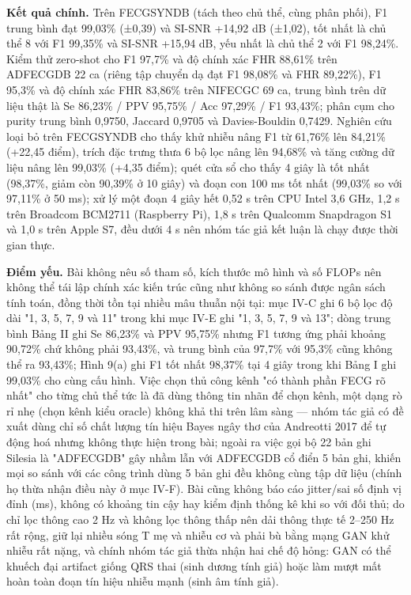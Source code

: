 \documentclass[12pt,a4paper]{article}
\begin{document}
\noindent \textbf{Kết quả chính.} Trên FECGSYNDB (tách theo chủ thể, cùng phân phối), F1 trung bình đạt 99,03\% (±0,39) và SI-SNR +14,92 dB (±1,02), tốt nhất là chủ thể 8 với F1 99,35\% và SI-SNR +15,94 dB, yếu nhất là chủ thể 2 với F1 98,24\%. Kiểm thử zero-shot cho F1 97,7\% và độ chính xác FHR 88,61\% trên ADFECGDB 22 ca (riêng tập chuyển dạ đạt F1 98,08\% và FHR 89,22\%), F1 95,3\% và độ chính xác FHR 83,86\% trên NIFECGC 69 ca, trung bình trên dữ liệu thật là Se 86,23\% / PPV 95,75\% / Acc 97,29\% / F1 93,43\%; phân cụm cho purity trung bình 0,9750, Jaccard 0,9705 và Davies-Bouldin 0,7429. Nghiên cứu loại bỏ trên FECGSYNDB cho thấy khử nhiễu nâng F1 từ 61,76\% lên 84,21\% (+22,45 điểm), trích đặc trưng thưa 6 bộ lọc nâng lên 94,68\% và tăng cường dữ liệu nâng lên 99,03\% (+4,35 điểm); quét cửa sổ cho thấy 4 giây là tốt nhất (98,37\%, giảm còn 90,39\% ở 10 giây) và đoạn con 100 ms tốt nhất (99,03\% so với 97,11\% ở 50 ms); xử lý một đoạn 4 giây hết 0,52 s trên CPU Intel 3,6 GHz, 1,2 s trên Broadcom BCM2711 (Raspberry Pi), 1,8 s trên Qualcomm Snapdragon S1 và 1,0 s trên Apple S7, đều dưới 4 s nên nhóm tác giả kết luận là chạy được thời gian thực.\par\vspace{3pt}
\noindent \textbf{Điểm yếu.} Bài không nêu số tham số, kích thước mô hình và số FLOPs nên không thể tái lập chính xác kiến trúc cũng như không so sánh được ngân sách tính toán, đồng thời tồn tại nhiều mâu thuẫn nội tại: mục IV-C ghi 6 bộ lọc độ dài "1, 3, 5, 7, 9 và 11" trong khi mục IV-E ghi "1, 3, 5, 7, 9 và 13"; dòng trung bình Bảng II ghi Se 86,23\% và PPV 95,75\% nhưng F1 tương ứng phải khoảng 90,72\% chứ không phải 93,43\%, và trung bình của 97,7\% với 95,3\% cũng không thể ra 93,43\%; Hình 9(a) ghi F1 tốt nhất 98,37\% tại 4 giây trong khi Bảng I ghi 99,03\% cho cùng cấu hình. Việc chọn thủ công kênh "có thành phần FECG rõ nhất" cho từng chủ thể tức là đã dùng thông tin nhãn để chọn kênh, một dạng rò rỉ nhẹ (chọn kênh kiểu oracle) không khả thi trên lâm sàng — nhóm tác giả có đề xuất dùng chỉ số chất lượng tín hiệu Bayes ngây thơ của Andreotti 2017 để tự động hoá nhưng không thực hiện trong bài; ngoài ra việc gọi bộ 22 bản ghi Silesia là "ADFECGDB" gây nhầm lẫn với ADFECGDB cổ điển 5 bản ghi, khiến mọi so sánh với các công trình dùng 5 bản ghi đều không cùng tập dữ liệu (chính họ thừa nhận điều này ở mục IV-F). Bài cũng không báo cáo jitter/sai số định vị đỉnh (ms), không có khoảng tin cậy hay kiểm định thống kê khi so với đối thủ; do chỉ lọc thông cao 2 Hz và không lọc thông thấp nên dải thông thực tế 2–250 Hz rất rộng, giữ lại nhiều sóng T mẹ và nhiễu cơ và phải bù bằng mạng GAN khử nhiễu rất nặng, và chính nhóm tác giả thừa nhận hai chế độ hỏng: GAN có thể khuếch đại artifact giống QRS thai (sinh dương tính giả) hoặc làm mượt mất hoàn toàn đoạn tín hiệu nhiễu mạnh (sinh âm tính giả).\par\vspace{3pt}
\end{document}
